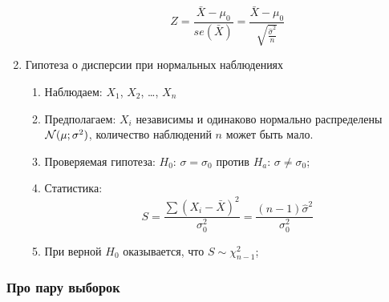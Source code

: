 \documentclass[12pt, a4paper]{article}
\begin{document}
\begin{enumerate}
\begin{enumerate}
	\[
	  Z = \frac{\bar X - \mu_0}{se(\bar X)} = \frac{\bar X - \mu_0}{\sqrt{\frac{\hat \sigma^2}{n}}}
	\]


  \end{enumerate}


  \item Гипотеза о дисперсии при нормальных наблюдениях
    \begin{enumerate}

      \item Наблюдаем: $X_1$, $X_2$, \ldots, $X_n$

      \item Предполагаем: $X_i$ независимы и одинаково нормально распределены $\mathcal{N}(\mu; \sigma^2)$, количество наблюдений $n$ может быть мало.

      \item Проверяемая гипотеза: $H_0$: $\sigma = \sigma_0$ против $H_a$: $\sigma \neq \sigma_0$;

      \item Статистика:
	\[
	  S = \frac{\sum (X_i - \bar X)^2}{\sigma_0^2} = \frac{(n-1)\hat\sigma^2}{\sigma_0^2}
      \]

    \item При верной $H_0$ оказывается, что $S \sim \chi^2_{n-1}$;


    \end{enumerate}

\end{enumerate}


\subsubsection{Про пару выборок}
\end{document}
